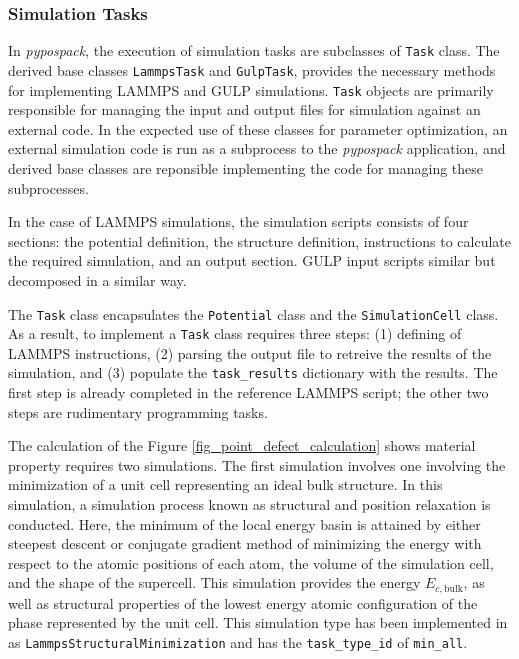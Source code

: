 \subsubsection{Simulation Tasks}
\label{sec:pypospack_tasks}

In \emph{pypospack}, the execution of simulation tasks are subclasses of \verb|Task| class.  The derived base classes \verb|LammpsTask| and \verb|GulpTask|, provides the necessary methods for implementing LAMMPS and GULP simulations. \verb|Task| objects are primarily responsible for managing the input and output files for simulation against an external code.  In the expected use of these classes for parameter optimization, an external simulation code is run as a  subprocess to the  \emph{pypospack} application, and derived base classes are reponsible implementing the code for managing these subprocesses.

In the case of LAMMPS simulations, the simulation scripts consists of four sections:  the potential definition, the structure definition, instructions to calculate the required simulation, and an output section.  GULP input scripts similar but decomposed in a similar way.

 The \verb|Task| class encapsulates the \verb|Potential| class and the \verb|SimulationCell| class.  As a result, to implement a \verb|Task| class requires three steps: (1) defining of LAMMPS instructions, (2) parsing the output file to retreive the results of the simulation, and (3) populate the \verb|task_results| dictionary with the results.  The first step is already completed in the reference LAMMPS script; the other two steps are rudimentary programming tasks.

The calculation of the Figure \ref{fig_point_defect_calculation} shows material property requires two simulations.  The first simulation involves one involving the minimization of a unit cell representing an ideal bulk structure.  In this simulation, a simulation process known as structural and position relaxation is conducted.  Here, the  minimum of the local energy basin is attained by either steepest descent or conjugate gradient method of minimizing the energy with respect to the atomic positions of each atom, the volume of the simulation cell, and the shape of the supercell.  This simulation provides the energy $E_{c,\mathrm{bulk}}$, as well as structural properties of the lowest energy atomic configuration of the phase represented by the unit cell.  This simulation type has been implemented in as \verb|LammpsStructuralMinimization| and has the \verb|task_type_id| of \verb|min_all|.

